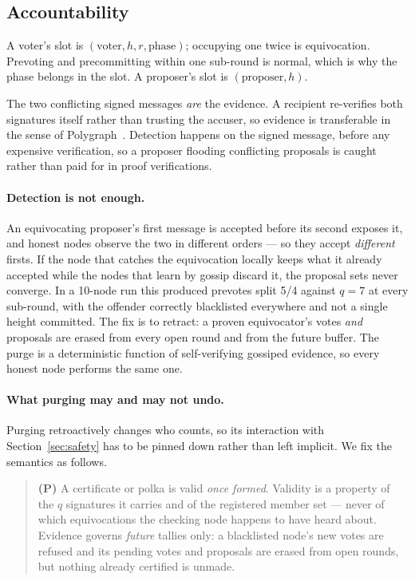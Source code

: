 \documentclass{llncs}
\begin{document}
\subsection{Accountability}
\label{sec:accountability}

A voter's slot is $(\mathrm{voter}, h, r, \mathrm{phase})$; occupying one twice
is equivocation. Prevoting and precommitting within one sub-round is normal,
which is why the phase belongs in the slot. A proposer's slot is
$(\mathrm{proposer}, h)$.

The two conflicting signed messages \emph{are} the evidence. A recipient
re-verifies both signatures itself rather than trusting the accuser, so evidence
is transferable in the sense of Polygraph~\cite{civit2021polygraph}. Detection
happens on the signed message, before any expensive verification, so a proposer
flooding conflicting proposals is caught rather than paid for in proof
verifications.

\paragraph{Detection is not enough.}
An equivocating proposer's first message is accepted before its second exposes
it, and honest nodes observe the two in different orders --- so they accept
\emph{different} firsts. If the node that catches the equivocation locally keeps
what it already accepted while the nodes that learn by gossip discard it, the
proposal sets never converge. In a 10-node run this produced prevotes split 5/4
against $q = 7$ at every sub-round, with the offender correctly blacklisted
everywhere and not a single height committed. The fix is to retract: a proven
equivocator's votes \emph{and} proposals are erased from every open round and
from the future buffer. The purge is a deterministic function of self-verifying
gossiped evidence, so every honest node performs the same one.

\paragraph{What purging may and may not undo.}
Purging retroactively changes who counts, so its interaction with
Section~\ref{sec:safety} has to be pinned down rather than left implicit. We fix
the semantics as follows.

\begin{quote}
\textbf{(P)} A certificate or polka is valid \emph{once formed}. Validity is a
property of the $q$ signatures it carries and of the registered member set ---
never of which equivocations the checking node happens to have heard about.
Evidence governs \emph{future} tallies only: a blacklisted node's new votes are
refused and its pending votes and proposals are erased from open rounds, but
nothing already certified is unmade.
\end{quote}
\end{document}
